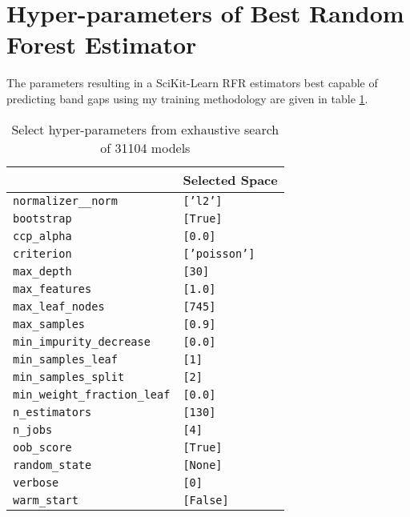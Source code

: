 \clearpage

\section*{Hyper-parameters of Best Random Forest Estimator}
\label{sec:org4ade3f5}
The parameters resulting in a SciKit-Learn RFR estimators best capable
of predicting band gaps using my training methodology are given in table \ref{tbl:rfrHPO}.

\begin{table}[htbp]
\caption{\label{tbl:rfrHPO} Select hyper-parameters from exhaustive search of 31104 models}
\centering
\begin{tabular}{ll}
 & Selected Space\\[0pt]
\hline
\texttt{normalizer\_\_norm} & \texttt{['l2']}\\[0pt]
\texttt{bootstrap} & \texttt{[True]}\\[0pt]
\texttt{ccp\_alpha} & \texttt{[0.0]}\\[0pt]
\texttt{criterion} & \texttt{['poisson']}\\[0pt]
\texttt{max\_depth} & \texttt{[30]}\\[0pt]
\texttt{max\_features} & \texttt{[1.0]}\\[0pt]
\texttt{max\_leaf\_nodes} & \texttt{[745]}\\[0pt]
\texttt{max\_samples} & \texttt{[0.9]}\\[0pt]
\texttt{min\_impurity\_decrease} & \texttt{[0.0]}\\[0pt]
\texttt{min\_samples\_leaf} & \texttt{[1]}\\[0pt]
\texttt{min\_samples\_split} & \texttt{[2]}\\[0pt]
\texttt{min\_weight\_fraction\_leaf} & \texttt{[0.0]}\\[0pt]
\texttt{n\_estimators} & \texttt{[130]}\\[0pt]
\texttt{n\_jobs} & \texttt{[4]}\\[0pt]
\texttt{oob\_score} & \texttt{[True]}\\[0pt]
\texttt{random\_state} & \texttt{[None]}\\[0pt]
\texttt{verbose} & \texttt{[0]}\\[0pt]
\texttt{warm\_start} & \texttt{[False]}\\[0pt]
\end{tabular}
\end{table}

\clearpage